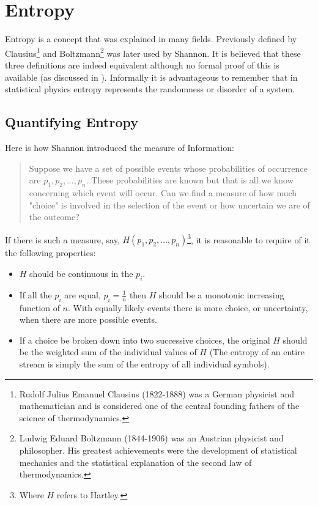\documentclass[12pt, a4paper]{report}
\begin{document}
\chapter{Entropy}

Entropy is a concept that was explained in many fields. Previously defined by Clausius\footnote{Rudolf Julius Emanuel Clausius
(1822-1888) was a German physicist and mathematician and is considered one of the central founding fathers of the science of
thermodynamics.} and Boltzmann\footnote{Ludwig Eduard Boltzmann (1844-1906) was an Austrian physicist and philosopher. His
greatest achievements were the development of statistical mechanics and the statistical explanation of the second law of
thermodynamics.} was later used by Shannon. It is believed that these three definitions are indeed equivalent although no formal
proof of this is available (as discussed in \cite{EntropyAndInformationTheoryUsesAndMisuses}). Informally it is advantageous to
remember that in statistical physics entropy represents the randomness or disorder of a system.

\section{Quantifying Entropy}

Here is how Shannon introduced the measure of Information:
\begin{quote}
Suppose we have a set of possible events whose probabilities of occurrence are \(p_1, p_2, \dots, p_n\). These probabilities are
known but that is all we know concerning which event will occur. Can we find a measure of how much "choice" is involved in the
selection of the event or how uncertain we are of the outcome?
\end{quote}
If there is such a measure, say, \(H(p_1, p_2, \dots, p_n)\)\footnote{Where \(H\) refers to Hartley.}, it is reasonable to require
of it the following properties:
\begin{itemize}
  \item \(H\) should be continuous in the \(p_i\).
  \item If all the \(p_i\) are equal, \(p_i = \frac{1}{n}\) then \(H\) should be a monotonic increasing function of \(n\). With
  equally likely events there is more choice, or uncertainty, when there are more possible events.
  \item If a choice be broken down into two successive choices, the original \(H\) should be the weighted sum of the individual
  values of \(H\) (The entropy of an entire stream is simply the sum of the entropy of all individual symbols).
\end{itemize}
\end{document}
